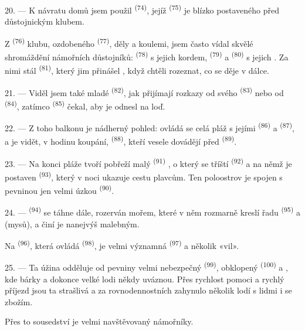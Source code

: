 \VUsaut{3.0mm}
\VUsaut{3.0mm}

20. --- K návratu domů jsem použil  \textsuperscript{(74)}, jejíž
 \textsuperscript{(75)} je blízko  postaveného před
důstojnickým klubem.

Z  \textsuperscript{(76)} klubu, ozdobeného 
\textsuperscript{(77)}, děly a koulemi, jsem často vídal skvělé shromáždění námořních
důstojníků:  \textsuperscript{(78)} s jejich kordem,
 \textsuperscript{(79)} a 
\textsuperscript{(80)} s jejich . Za nimi stál 
\textsuperscript{(81)}, který jim přinášel , když chtěli rozeznat, co se
děje v dálce.

21. --- Viděl jsem také mladé  \textsuperscript{(82)}, jak přijímají
rozkazy od svého  \textsuperscript{(83)} nebo od 
\textsuperscript{(84)}, zatímco  \textsuperscript{(85)} čekal, aby je
odnesl na loď.

22. --- Z toho balkonu je nádherný pohled: ovládá se celá pláž s jejími 
\textsuperscript{(86)} a  \textsuperscript{(87)}, a je vidět, v hodinu
koupání,  \textsuperscript{(88)}, kteří vesele dovádějí před
 \textsuperscript{(89)}.

23. --- Na konci pláže tvoří pobřeží malý  \textsuperscript{(91)}
, o který se tříští  \textsuperscript{(92)} a na
němž je postaven  \textsuperscript{(93)}, který v noci ukazuje cestu plavcům.
Ten poloostrov je spojen s pevninou jen velmi úzkou  \textsuperscript{(90)}.

\VUsaut{3.0mm}
\VUsaut{3.0mm}

24. ---  \textsuperscript{(94)} se táhne dále, rozerván mořem, které v něm
rozmarně kreslí řadu  \textsuperscript{(95)} a  (mysů), a činí
je nanejvýš malebným.

Na  \textsuperscript{(96)}, která ovládá 
\textsuperscript{(98)}, je velmi významná  \textsuperscript{(97)} a několik
«vil».

25. --- Ta úžina odděluje od pevniny velmi nebezpečný  \textsuperscript{(99)},
obklopený  \textsuperscript{(100)} a
, kde bárky a dokonce velké lodi někdy uváznou. Přes rychlost pomoci a
rychlý příjezd  jsou ta  strašlivá a za
rovnodennostních  zahynulo několik lodí s lidmi i se zbožím.

Přes to sousedství je  velmi navštěvovaný námořníky.
